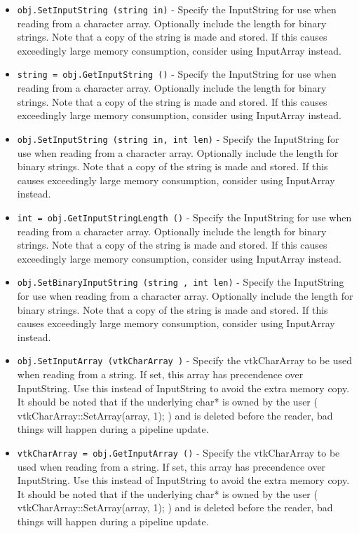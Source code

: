 \begin{itemize}
\item  \verb|obj.SetInputString (string in)| -  Specify the InputString for use when reading from a character array.
 Optionally include the length for binary strings. Note that a copy
 of the string is made and stored. If this causes exceedingly large
 memory consumption, consider using InputArray instead.

\item  \verb|string = obj.GetInputString ()| -  Specify the InputString for use when reading from a character array.
 Optionally include the length for binary strings. Note that a copy
 of the string is made and stored. If this causes exceedingly large
 memory consumption, consider using InputArray instead.

\item  \verb|obj.SetInputString (string in, int len)| -  Specify the InputString for use when reading from a character array.
 Optionally include the length for binary strings. Note that a copy
 of the string is made and stored. If this causes exceedingly large
 memory consumption, consider using InputArray instead.

\item  \verb|int = obj.GetInputStringLength ()| -  Specify the InputString for use when reading from a character array.
 Optionally include the length for binary strings. Note that a copy
 of the string is made and stored. If this causes exceedingly large
 memory consumption, consider using InputArray instead.

\item  \verb|obj.SetBinaryInputString (string , int len)| -  Specify the InputString for use when reading from a character array.
 Optionally include the length for binary strings. Note that a copy
 of the string is made and stored. If this causes exceedingly large
 memory consumption, consider using InputArray instead.

\item  \verb|obj.SetInputArray (vtkCharArray )| -  Specify the vtkCharArray to be used  when reading from a string.
 If set, this array has precendence over InputString.
 Use this instead of InputString to avoid the extra memory copy.
 It should be noted that if the underlying char* is owned by the
 user ( vtkCharArray::SetArray(array, 1); ) and is deleted before
 the reader, bad things will happen during a pipeline update.

\item  \verb|vtkCharArray = obj.GetInputArray ()| -  Specify the vtkCharArray to be used  when reading from a string.
 If set, this array has precendence over InputString.
 Use this instead of InputString to avoid the extra memory copy.
 It should be noted that if the underlying char* is owned by the
 user ( vtkCharArray::SetArray(array, 1); ) and is deleted before
 the reader, bad things will happen during a pipeline update.


\end{itemize}

